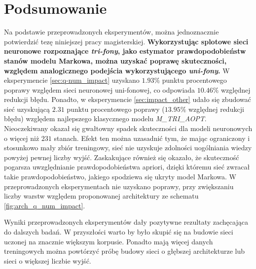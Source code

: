 \documentclass[shortabstract, mgr]{iithesis}
\begin{document}
\section{ Podsumowanie }
	Na podstawie przeprowadzonych eksperymentów, można jednoznacznie potwierdzić tezę niniejszej pracy magisterskiej. \textbf{Wykorzystując splotowe sieci neuronowe rozpoznające \textit{tri-fony}, jako estymator prawdopodobieństw stanów modelu Markowa, można uzyskać poprawę skuteczności, względem analogicznego podejścia wykorzystującego \textit{uni-fony}.} W eksperymencie \ref{sec:q-num_impact} uzyskano $1.93\%$ punktu procentowego poprawy względem sieci neuronowej uni-fonowej, co odpowiada $10.46\%$ względnej redukcji błędu. Ponadto, w eksperymencie \ref{sec:impact_other} udało się zbudować sieć uzyskującą $2.31$ punktu procentowego poprawy ($13.95\%$ względnej redukcji błędu) względem najlepszego klasycznego modelu \textit{M\_TRI\_AOPT}. Nieoczekiwany okazał się gwałtowny spadek skuteczności dla modeli neuronowych o więcej niż $231$ stanach. Efekt ten można uzasadnić tym, że mając ograniczony i stosunkowo mały zbiór treningowy, sieć nie uzyskuje zdolności uogólniania wiedzy powyżej pewnej liczby wyjść. Zaskakujące również się okazało, że skuteczność pogarsza uwzględnianie prawdopodobieństwa apriori, dzięki któremu sieć zwracał takie prawdopodobieństwo, jakiego spodziewa się ukryty model Markowa. W przeprowadzonych eksperymentach nie uzyskano poprawy, przy zwiększaniu liczby warstw względem proponowanej architektury ze schematu \ref{fig:arch_q_num_impact}.
	
	Wyniki przeprowadzonych eksperymentów dały pozytywne rezultaty zachęcająca do dalszych badań. W przyszłości warto by było skupić się na budowie sieci uczonej na znacznie większym korpusie. Ponadto mają więcej danych treningowych można powtórzyć próbę budowy sieci o głębszej architekturze lub sieci o większej liczbie wyjść.
   
   
	
	
\end{document}

